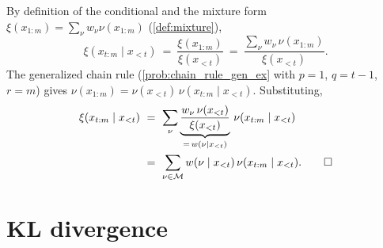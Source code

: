 \documentclass[fontsize=11pt, parskip=half]{scrartcl}
\newcommand{\Mc}{\mathcal{M}}
\begin{document}
\begin{solution}
By definition of the conditional and the mixture form $\xi(x_{1:m}) = \sum_\nu w_\nu \nu(x_{1:m})$ (\cref{def:mixture}),
\[
  \xi(x_{t:m} \mid x_{<t})
  ~=~ \frac{\xi(x_{1:m})}{\xi(x_{<t})}
  ~=~ \frac{\sum_\nu w_\nu\, \nu(x_{1:m})}{\xi(x_{<t})}.
\]
The generalized chain rule (\cref{prob:chain_rule_gen_ex} with $p=1$, $q=t-1$, $r=m$) gives $\nu(x_{1:m}) = \nu(x_{<t})\,\nu(x_{t:m} \mid x_{<t})$. Substituting,
\begin{align*}
  \xi(x_{t:m} \mid x_{<t})
  ~&=~ \sum_\nu \underbrace{\frac{w_\nu\, \nu(x_{<t})}{\xi(x_{<t})}}_{=\, w(\nu \mid x_{<t})}\, \nu(x_{t:m} \mid x_{<t}) \\
  ~&=~ \sum_{\nu \in \Mc} w(\nu \mid x_{<t})\, \nu(x_{t:m} \mid x_{<t}). \qedhere
\end{align*}
\end{solution}

\section{KL divergence}\label{prob:chain_rule}

%
%
\end{document}
